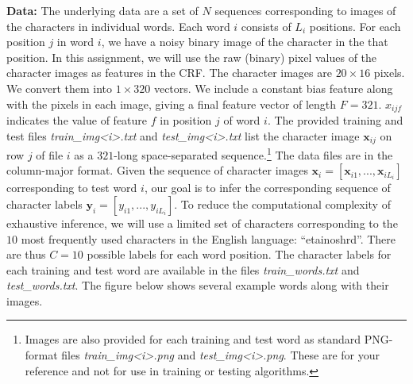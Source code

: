 \documentclass[11pt]{article}
\newcommand{\mbf}[1]{{\mathbf{#1}}}
\begin{document}
\textbf{Data: } The underlying data are a set of $N$ sequences corresponding to images of the characters in individual words. Each word $i$ consists of $L_i$ positions. For each position $j$ in word $i$, we have a noisy binary image of the character in the that position. In this assignment, we will use the raw (binary) pixel values of the character images as features in the CRF. The character images are $20\times 16$ pixels. We convert them into $1\times 320$ vectors. We include a constant bias feature along with the pixels in each image, giving a final feature vector of
length $F=321$. $x_{ijf}$ indicates the value of feature $f$ in position $j$ of word $i$. The provided training and test files \textit{train\_img<i>.txt} and \textit{test\_img<i>.txt} list the character image $\mbf{x}_{ij}$ on row $j$ of file $i$ as a $321$-long space-separated sequence.\footnote{Images are also provided for each training and test word as standard PNG-format files \textit{train\_img<i>.png} and \textit{test\_img<i>.png}. These are for your reference and not for use in training or testing algorithms.}
The data files are in the column-major format.
Given the sequence of character images $\mbf{x}_i=[\mbf{x}_{i1},...,\mbf{x}_{iL_i}]$ corresponding to test word $i$, our goal is to infer the corresponding sequence of character labels $\mbf{y}_i=[y_{i1},...,y_{iL_i}]$. To reduce the computational complexity of exhaustive inference, we will use a limited set of characters corresponding to the $10$ most frequently used characters in the English language: ``etainoshrd''. There are thus $C=10$ possible labels for each word position.
The character labels for each training and test word are available in the files
\textit{train\_words.txt} and \textit{test\_words.txt}. The figure below shows several example words along
with their images.  
\end{document}
